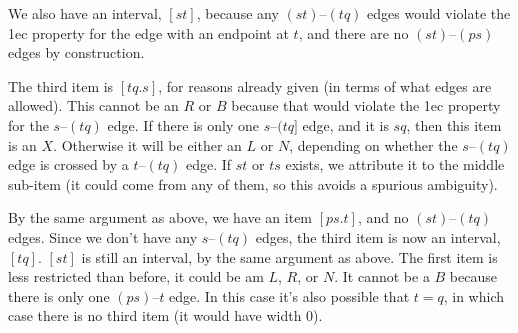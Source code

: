 We also have an interval, $[st]$, because any $(st)$--$(tq)$ edges would violate the 1ec property for the edge with an endpoint at $t$, and there are no $(st)$--$(ps)$ edges by construction.

The third item is $[tq.s]$, for reasons already given (in terms of what edges are allowed).
This cannot be an $R$ or $B$ because that would violate the 1ec property for the $s$--$(tq)$ edge.
If there is only one $s$--$(tq]$ edge, and it is $sq$, then this item is an $X$.
Otherwise it will be either an $L$ or $N$, depending on whether the $s$--$(tq)$ edge is crossed by a $t$--$(tq)$ edge.
If $st$ or $ts$ exists, we attribute it to the middle sub-item (it could come from any of them, so this avoids a spurious ambiguity).


\begin{center}
\end{center}

By the same argument as above, we have an item $[ps.t]$, and no $(st)$--$(tq)$ edges.
Since we don't have any $s$--$(tq)$ edges, the third item is now an interval, $[tq]$.
$[st]$ is still an interval, by the same argument as above.
The first item is less restricted than before, it could be am $L$, $R$, or $N$.
It cannot be a $B$ because there is only one $(ps)$--$t$ edge.
In this case it's also possible that $t = q$, in which case there is no third item (it would have width 0).


